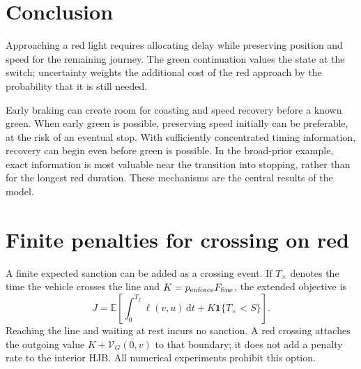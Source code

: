 \documentclass[journal,a4paper,twocolumn]{IEEEtran}
\newcommand{\dd}{\,\mathrm{d}}
\newcommand{\ind}{\mathbf{1}}
\begin{document}
\section{Conclusion}
Approaching a red light requires allocating delay while preserving position and speed for the remaining journey. The green continuation values the state at the switch; uncertainty weights the additional cost of the red approach by the probability that it is still needed.

Early braking can create room for coasting and speed recovery before a known green. When early green is possible, preserving speed initially can be preferable, at the risk of an eventual stop. With sufficiently concentrated timing information, recovery can begin even before green is possible. In the broad-prior example, exact information is most valuable near the transition into stopping, rather than for the longest red duration. These mechanisms are the central results of the model.

\appendices
\section{Finite penalties for crossing on red}\label{app:fine}
A finite expected sanction can be added as a crossing event. If $T_\times$ denotes the time the vehicle crosses the line and $K=p_{\rm enforce}F_{\rm fine}$, the extended objective is
\begin{equation}
 J=\mathbb E\!\left[\int_0^{T_f}\ell(v,u)\dd t
 +K\ind\{T_\times<S\}\right].
 \label{eq:finiteobjective}
\end{equation}
Reaching the line and waiting at rest incurs no sanction. A red crossing attaches the outgoing value $K+\mathcal V_G(0,v)$ to that boundary; it does not add a penalty rate to the interior HJB. All numerical experiments prohibit this option.
\end{document}
